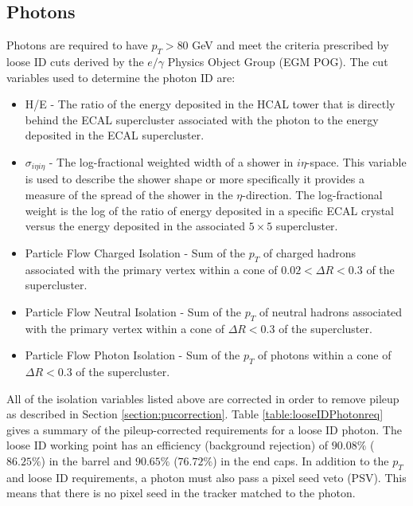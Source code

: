 \subsection{Photons}
Photons are required to have $p_T>80$ GeV and meet the criteria prescribed by loose ID cuts derived by the $e/\gamma$ Physics Object Group (EGM POG).  The cut variables used to determine the photon ID are:
\begin{itemize}
	\item H/E - The ratio of the energy deposited in the HCAL tower that is directly behind the ECAL supercluster associated with the photon to the energy deposited in the ECAL supercluster.
	\item $\sigma_{i\eta i\eta}$ - The log-fractional weighted width of a shower in $i\eta$-space.  This variable is used to describe the shower shape or more specifically it provides a measure of the spread of the shower in the $\eta$-direction.  The log-fractional weight is the log of the ratio of energy deposited in a specific ECAL crystal versus the energy deposited in the associated $5\times 5$ supercluster.
	\item Particle Flow Charged Isolation - Sum of the $p_T$ of charged hadrons associated with the primary vertex within a cone of $0.02 < \Delta R < 0.3$ of the supercluster.
	\item Particle Flow Neutral Isolation - Sum of the $p_T$ of neutral hadrons associated with the primary vertex within a cone of $\Delta R < 0.3$ of the supercluster.
	\item Particle Flow Photon Isolation - Sum of the $p_T$ of photons within a cone of $\Delta R < 0.3$ of the supercluster.
\end{itemize}

All of the isolation variables listed above are corrected in order to remove pileup as described in Section \ref{section:pucorrection}.  Table \ref{table:looseIDPhotonreq} gives a summary of the pileup-corrected requirements for a loose ID photon.  The loose ID working point has an efficiency (background rejection) of $90.08\%$ ($86.25\%$) in the barrel and $90.65\%$ ($76.72\%$) in the end caps.  In addition to the $p_T$ and loose ID requirements, a photon must also pass a pixel seed veto (PSV).  This means that there is no pixel seed in the tracker matched to the photon.

